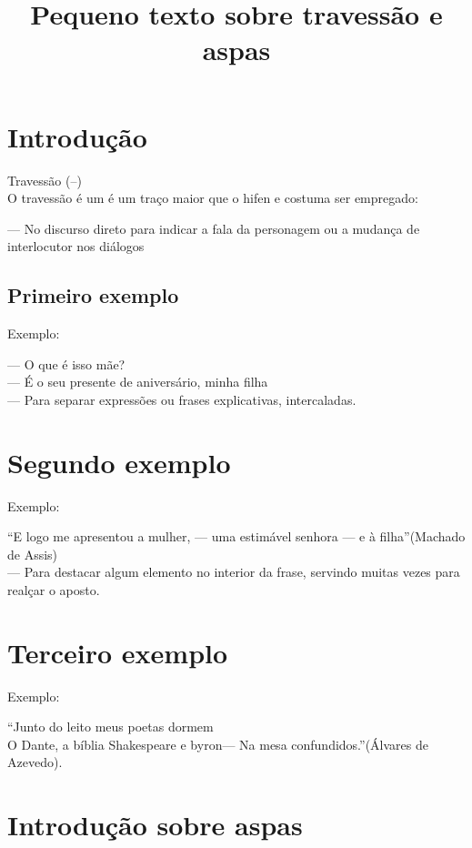 \documentclass[12pt, article, oneside]{memoir}
\begin{document}
\title{ Pequeno texto sobre travessão e aspas}
\maketitle

\tableofcontents
\newpage
\chapter{Introdução}  




Travessão (--)\\
O travessão é um é um traço maior que o hifen e costuma ser empregado:

--- No discurso direto para indicar a fala da personagem ou a mudança de interlocutor nos diálogos
\section{Primeiro exemplo}

Exemplo:

--- O que é isso mãe?\\
--- É o seu presente de aniversário, minha filha\\
--- Para separar expressões ou frases explicativas, intercaladas.\\
\chapter{Segundo exemplo}
Exemplo:

``E logo me apresentou a mulher, --- uma estimável senhora --- e à filha''(Machado de Assis)\\
--- Para destacar algum elemento no interior da frase, servindo muitas vezes para realçar o aposto.\\
\newpage
\chapter{Terceiro exemplo}
Exemplo:

``Junto do leito meus poetas dormem\\
O Dante, a bíblia Shakespeare e byron--- \newline
Na mesa confundidos.''(Álvares de Azevedo).
\newpage
\chapter{Introdução sobre aspas}
\end{document}

